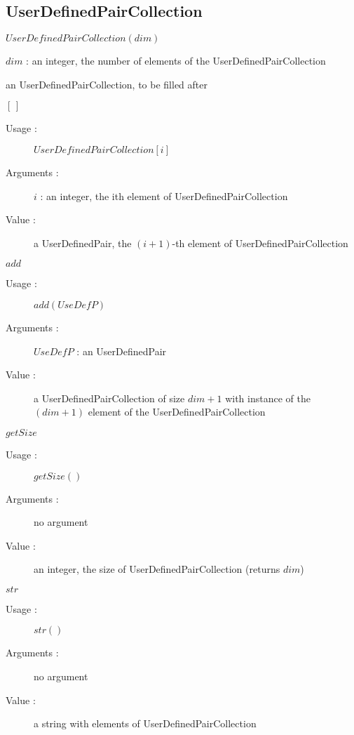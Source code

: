\newpage \subsection{UserDefinedPairCollection}

\begin{description}

\item[Usage :] $UserDefinedPairCollection(dim)$

\item[Arguments :]  $dim$ : an integer, the number of elements of the UserDefinedPairCollection

\item[Value :] an UserDefinedPairCollection, to be filled after

\item[Some methods :]  \rule{0pt}{1em}

  \begin{description}

  \item $[\,]$
    \begin{description}
    \item[Usage :] $UserDefinedPairCollection[i]$
    \item[Arguments :] $i$ : an integer, the ith element of UserDefinedPairCollection
    \item[Value :] a UserDefinedPair, the $(i+1)$-th element of UserDefinedPairCollection
    \end{description}
    \bigskip

  \item $add$
    \begin{description}
    \item[Usage :] $add(UseDefP)$
    \item[Arguments :] $UseDefP$ : an UserDefinedPair
    \item[Value :]      a UserDefinedPairCollection of size  $dim +1$
      with instance of the $(dim+1)$ element of the UserDefinedPairCollection
    \end{description}
    \bigskip

  \item $getSize$
    \begin{description}
    \item[Usage :] $getSize()$
    \item[Arguments :] no argument
    \item[Value :]      an integer, the size of UserDefinedPairCollection (returns $dim$)
    \end{description}
    \bigskip

  \item $str$
    \begin{description}
    \item[Usage :] $str()$
    \item[Arguments :] no argument
    \item[Value :]   a string with elements of UserDefinedPairCollection
    \end{description}

  \end{description}
\end{description}

